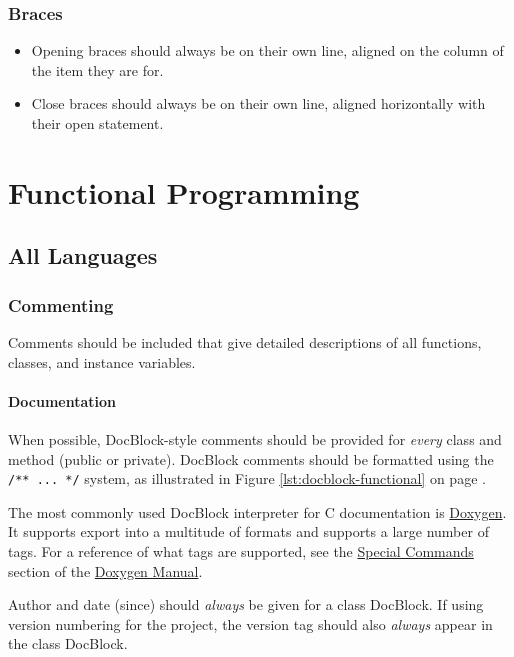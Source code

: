 \documentclass[12pt,letter]{memoir} %
\begin{document}
		\subsection{Braces}
			\begin{itemize}
				\item Opening braces should always be on their own line, aligned
					on the column of the item they are for.
				\item Close braces should always be on their own line, aligned
					horizontally with their open statement.
			\end{itemize}

\chapter{Functional Programming}
	\section{All Languages}
		\subsection{Commenting}
			Comments should be included that give detailed descriptions of all functions,
			classes, and instance variables.
			\subsubsection{Documentation}
				When possible, DocBlock-style comments should be provided for
                \emph{every} class and method (public or private). DocBlock
                comments should be formatted using the \texttt{/** ... */}
                system, as illustrated in Figure \ref{lst:docblock-functional}
                on page \pageref{lst:docblock-functional}.

				The most commonly used DocBlock interpreter for C documentation
                is \href{http://www.stack.nl/~dimitri/doxygen/}{Doxygen}. It
                supports export into a multitude of formats and supports a large
                number of tags. For a reference of what tags are supported, see
                the
                \href{http://www.stack.nl/~dimitri/doxygen/manual/commands.html}{Special Commands}
				section of the
                \href{http://www.stack.nl/~dimitri/doxygen/manual/index.html}{Doxygen Manual}.

				Author and date (since) should \emph{always} be given for a
                class DocBlock. If using version numbering for the project, the
                version tag should also \emph{always} appear in the class
                DocBlock.
\end{document}

